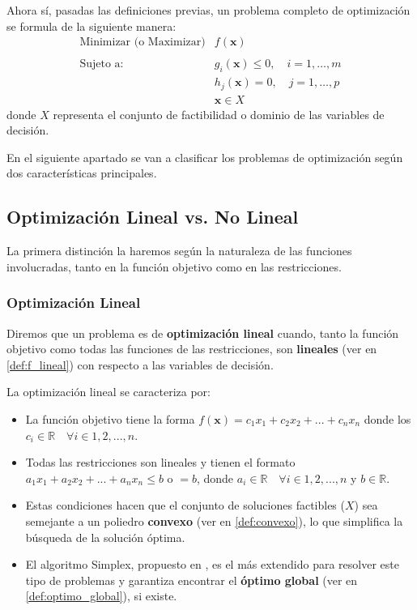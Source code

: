 \documentclass[12pt,a4paper]{book}
\begin{document}
Ahora sí, pasadas las definiciones previas, un problema completo de optimización se formula de la siguiente manera:
$$
\begin{array}{ll}
\text{Minimizar (o Maximizar)} & f(\mathbf{x}) \\ \\
\text{Sujeto a:} & g_i(\mathbf{x}) \le 0, \quad i = 1, \ldots, m \\
& h_j(\mathbf{x}) = 0, \quad j = 1, \ldots, p \\
& \mathbf{x} \in X
\end{array}
$$
donde $X$ representa el conjunto de factibilidad o dominio de las variables de decisión.

En el siguiente apartado se van a clasificar los problemas de optimización según dos características principales.

\subsection{Optimización Lineal vs. No Lineal}

La primera distinción la haremos según la naturaleza de las funciones involucradas, tanto en la función objetivo como en las restricciones.

\subsubsection{Optimización Lineal}
Diremos que un problema es de \textbf{optimización lineal} cuando, tanto la función objetivo como todas las funciones de las restricciones, son \textbf{lineales} (ver en \ref{def:f_lineal}) con respecto a las variables de decisión. 

La optimización lineal se caracteriza por:
\begin{itemize}
    \item La función objetivo tiene la forma $f(\mathbf{x})=c_1x_1+c_2x_2+...+c_nx_n$ donde los $c_i \in \mathbb{R} \quad \forall i \in 1,2,...,n$.
    \item Todas las restricciones son lineales y tienen el formato $a_1x_1+a_2x_2+...+a_nx_n\leq b$ o $=b$, donde $a_i \in \mathbb{R} \quad \forall i \in 1,2,...,n$ y $b\in \mathbb{R}$.
    \item Estas condiciones hacen que el conjunto de soluciones factibles ($X$) sea semejante a un poliedro \textbf{convexo} (ver en \ref{def:convexo}), lo que simplifica la búsqueda de la solución óptima.
    \item El algoritmo Simplex, propuesto en \cite{Dantzig1951}, es el más extendido para resolver este tipo de problemas y garantiza encontrar el \textbf{óptimo global} (ver en \ref{def:optimo_global}), si existe.
\end{itemize}
\end{document}
